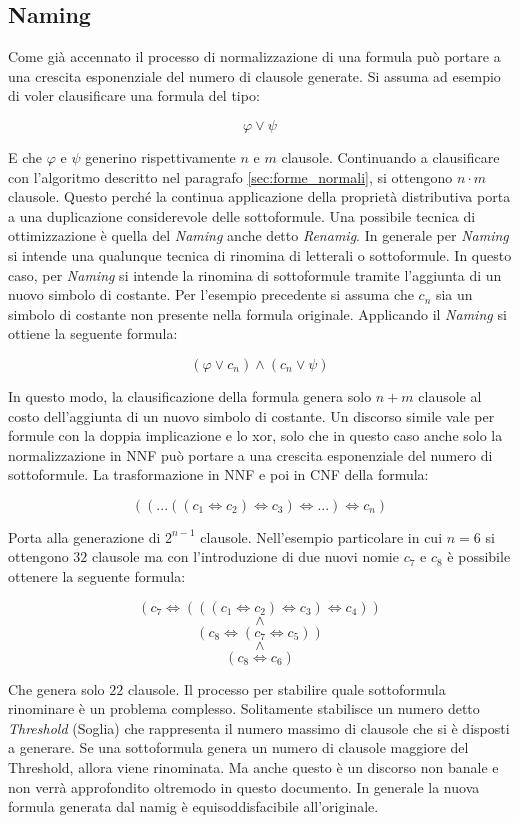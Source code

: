 \documentclass[./main.tex]{subfiles}
\begin{document}
\subsection{Naming}
Come già accennato il processo di normalizzazione di una formula può portare a una crescita esponenziale del numero di clausole generate.
Si assuma ad esempio di voler clausificare una formula del tipo:

$$ \varphi \lor \psi$$

E che $\varphi$ e $\psi$ generino rispettivamente $n$ e $m$ clausole. Continuando a clausificare con l'algoritmo 
descritto nel paragrafo \ref{sec:forme_normali}, si ottengono $n \cdot m$ clausole. 
Questo perché la continua applicazione della proprietà distributiva porta a una duplicazione considerevole delle sottoformule.
Una possibile tecnica di ottimizzazione è quella del \textit{Naming} anche detto \textit{Renamig}.
In generale per \textit{Naming} si intende una qualunque tecnica di rinomina di letterali o sottoformule.
In questo caso, per \textit{Naming} si intende la rinomina di sottoformule tramite l'aggiunta di un nuovo simbolo di costante.
Per l'esempio precedente si assuma che $c_n$ sia un simbolo di costante non presente nella formula originale.
Applicando il \textit{Naming} si ottiene la seguente formula:

$$ (\varphi \lor c_n) \land (c_n \lor \psi)$$

In questo modo, la clausificazione della formula genera solo $n + m$ clausole al costo dell'aggiunta di un nuovo simbolo di costante.
Un discorso simile vale per formule con la doppia implicazione e lo xor, solo che in questo caso
anche solo la normalizzazione in NNF può portare a una crescita esponenziale del numero di sottoformule.
La trasformazione in NNF e poi in CNF della formula:

$$ ((...((c_1 \Leftrightarrow c_2) \Leftrightarrow c_3) \Leftrightarrow ...) \Leftrightarrow c_n)$$

Porta alla generazione di $2^{n-1}$ clausole. Nell'esempio particolare in cui $n=6$ si ottengono $32$ clausole ma con l'introduzione 
di due nuovi nomie $c_7$ e $c_8$ è possibile ottenere la seguente formula:

$$ (c_7 \Leftrightarrow (((c_1 \Leftrightarrow c_2) \Leftrightarrow c_3) \Leftrightarrow c_4)) $$
$$ \land $$
$$ (c_8 \Leftrightarrow (c_7 \Leftrightarrow c_5)) $$
$$ \land $$
$$ (c_8 \Leftrightarrow c_6) $$

Che genera solo $22$ clausole.
Il processo per stabilire quale sottoformula rinominare è un problema complesso. 
Solitamente stabilisce un numero detto \textit{Threshold} (Soglia) che rappresenta il numero massimo di clausole che si è disposti a generare.
Se una sottoformula genera un numero di clausole maggiore del Threshold, allora viene rinominata. 
Ma anche questo è un discorso non banale e non verrà approfondito oltremodo in questo documento.
In generale la nuova formula generata dal namig è equisoddisfacibile all'originale.
\end{document}
